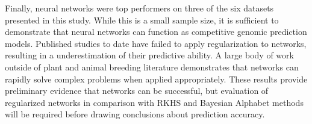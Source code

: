 Finally, neural networks were top performers on three of the six datasets
presented in this study. While this is a small sample size, it is
sufficient to demonstrate that neural networks can function as 
competitive genomic prediction models. Published studies to date have failed 
to apply regularization to networks, resulting in a underestimation 
of their predictive ability. A large body of work outside of plant 
and animal breeding literature demonstrates that networks can 
rapidly solve complex problems when applied appropriately.
These results provide preliminary evidence that networks can be successful,
but evaluation of regularized networks in comparison with RKHS and 
Bayesian Alphabet methods will be required before drawing conclusions about 
prediction accuracy.




